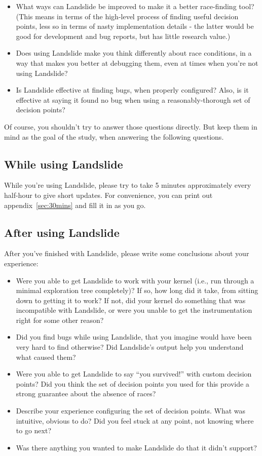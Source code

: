 \documentclass{article}
\begin{document}
\begin{itemize}
	\item What ways can Landslide be improved to make it a better race-finding tool? (This means in terms of the high-level process of finding useful decision points, less so in terms of nasty implementation details - the latter would be good for development and bug reports, but has little research value.)
	\item Does using Landslide make you think differently about race conditions, in a way that makes you better at debugging them, even at times when you're not using Landslide?
	\item Is Landslide effective at finding bugs, when properly configured? Also, is it effective at saying it found no bug when using a reasonably-thorough set of decision points?
\end{itemize}

Of course, you shouldn't try to answer those questions directly. But keep them in mind as the goal of the study, when answering the following questions.

\subsection{While using Landslide}

While you're using Landslide, please try to take 5 minutes approximately every half-hour to give short updates. For convenience, you can print out appendix~\ref{sec:30mins} and fill it in as you go.

\subsection{After using Landslide}

After you've finished with Landslide, please write some conclusions about your experience:

\begin{itemize}
	\item Were you able to get Landslide to work with your kernel (i.e., run through a minimal exploration tree completely)? If so, how long did it take, from sitting down to getting it to work? If not, did your kernel do something that was incompatible with Landslide, or were you unable to get the instrumentation right for some other reason?
	\item Did you find bugs while using Landslide, that you imagine would have been very hard to find otherwise? Did Landslide's output help you understand what caused them?
	\item Were you able to get Landslide to say ``you survived!'' with custom decision points? Did you think the set of decision points you used for this provide a strong guarantee about the absence of races?
	\item Describe your experience configuring the set of decision points. What was intuitive, obvious to do? Did you feel stuck at any point, not knowing where to go next?
	\item Was there anything you wanted to make Landslide do that it didn't support?
\end{itemize}
\end{document}
